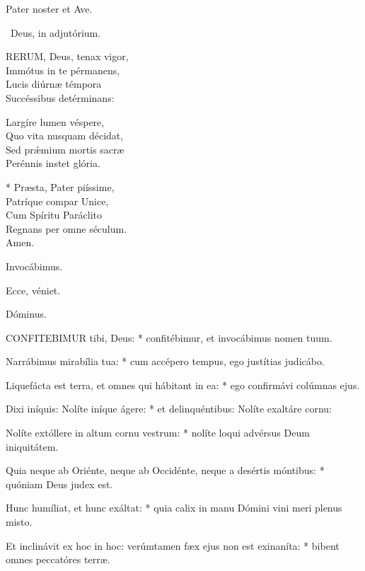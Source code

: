
\sectionornament


Pater noster et Ave.

\V\ Deus, in adjutórium.


\lettrine[lines=2]{R}{ERUM}, Deus, tenax vigor,\\
Immótus in te pérmanens,\\
Lucis diúrnæ témpora\\
Succéssibus detérminans:

Largíre lumen véspere,\\
Quo vita nusquam décidat,\\
Sed prǽmium mortis sacræ\\
Perénnis instet glória.

* Præsta, Pater piíssime,\\
Patríque compar Unice,\\
Cum Spíritu Paráclito\\
Regnans per omne séculum.\\
Amen.

  Invocábimus.


  Ecce, véniet.

  Dóminus.


\lettrine[lines=2]{C}{ONFITEBIMUR} tibi, Deus: * confitébimur, et invocábimus nomen tuum.

Narrábimus mirabília tua: * cum accépero tempus, ego justítias judicábo.

Liquefácta est terra, et omnes qui hábitant in ea: * ego confirmávi colúmnas ejus.

Dixi iníquis: Nolíte iníque ágere: * et delinquéntibus: Nolíte exaltáre cornu:

Nolíte extóllere in altum cornu vestrum: * nolíte loqui advérsus Deum iniquitátem.

Quia neque ab Oriénte, neque ab Occidénte, neque a desértis móntibus: * quóniam Deus judex est.

Hunc humíliat, et hunc exáltat: * quia calix in manu Dómini vini meri plenus misto.

Et inclinávit ex hoc in hoc: verúmtamen fæx ejus non est exinaníta: * bibent omnes peccatóres terræ.

